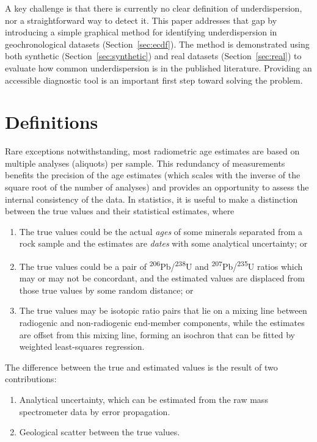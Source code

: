 \documentclass[gchron, manuscript]{copernicus}
\begin{document}
A key challenge is that there is currently no clear definition of
underdispersion, nor a straightforward way to detect it. This paper
addresses that gap by introducing a simple graphical method for
identifying underdispersion in geochronological datasets
(Section~\ref{sec:ecdf}). The method is demonstrated using both
synthetic (Section~\ref{sec:synthetic}) and real datasets
(Section~\ref{sec:real}) to evaluate how common underdispersion is in
the published literature. Providing an accessible diagnostic tool is
an important first step toward solving the problem.

\section{Definitions}\label{sec:definitions}

Rare exceptions notwithstanding, most radiometric age estimates are
based on multiple analyses (aliquots) per sample.  This redundancy
of measurements benefits the precision of the age estimates (which
scales with the inverse of the square root of the number of analyses)
and provides an opportunity to assess the internal consistency of the
data. In statistics, it is useful to make a distinction between the
true values and their statistical estimates, where

\begin{enumerate}
\item The true values could be the actual \emph{ages} of some minerals
  separated from a rock sample and the estimates are \emph{dates} with
  some analytical uncertainty; or
\item The true values could be a pair of
  \textsuperscript{206}Pb/\textsuperscript{238}U and
  \textsuperscript{207}Pb/\textsuperscript{235}U ratios which may or
  may not be concordant, and the estimated values are displaced from
  those true values by some random distance; or
\item The true values may be isotopic ratio pairs that lie on a mixing
  line between radiogenic and non-radiogenic end-member components,
  while the estimates are offset from this mixing line, forming an
  isochron that can be fitted by weighted least-squares regression.
\end{enumerate}

The difference between the true and estimated values is the result of
two contributions:

\begin{enumerate}
\item Analytical uncertainty, which can be estimated from the raw mass
  spectrometer data by error propagation.
\item Geological scatter between the true values.
\end{enumerate}
\end{document}
